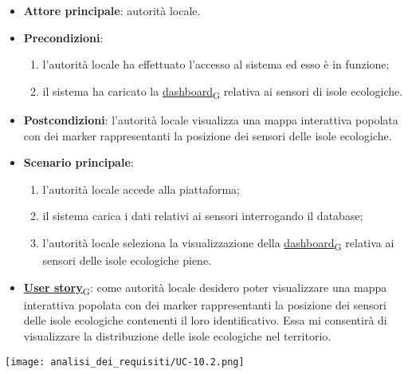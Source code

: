 \begin{itemize}
	\item \textbf{Attore principale}: autorità locale.
	\item \textbf{Precondizioni}:
	      \begin{enumerate}
		      \item l'autorità locale ha effettuato l'accesso al sistema ed esso è in funzione;
		      \item il sistema ha caricato la \href{https://7last.github.io/docs/rtb/documentazione-interna/glossario\#dashboard}{dashboard\textsubscript{G}} relativa ai sensori di isole ecologiche.
	      \end{enumerate}
	\item \textbf{Postcondizioni}: l'autorità locale visualizza una mappa interattiva popolata con dei marker rappresentanti la posizione dei sensori delle isole ecologiche.
	\item \textbf{Scenario principale}:
	      \begin{enumerate}
		      \item l'autorità locale accede alla piattaforma;
		      \item il sistema carica i dati relativi ai sensori interrogando il database;
		      \item l'autorità locale seleziona la visualizzazione della \href{https://7last.github.io/docs/rtb/documentazione-interna/glossario\#dashboard}{dashboard\textsubscript{G}} relativa ai sensori delle isole ecologiche piene.
	      \end{enumerate}
	\item \href{https://7last.github.io/docs/rtb/documentazione-interna/glossario\#user-story}{\textbf{User story}\textsubscript{G}}:
	      come autorità locale desidero poter visualizzare una mappa interattiva popolata con dei marker rappresentanti la posizione dei sensori delle isole ecologiche
	      contenenti il loro identificativo. Essa mi consentirà di visualizzare la distribuzione delle isole ecologiche nel territorio.
\end{itemize}
\begin{center}
	\texttt{[image: analisi\_dei\_requisiti/UC-10.2.png]}
\end{center}

\newpage

